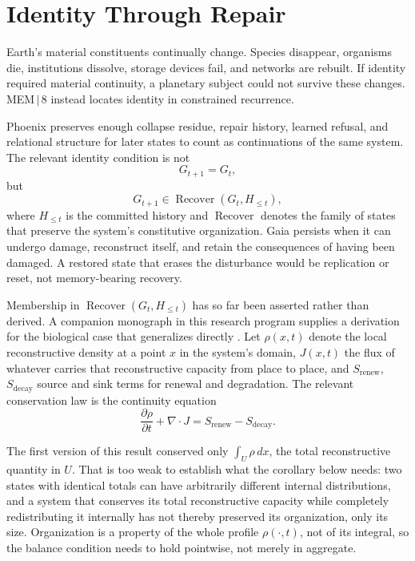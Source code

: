 \documentclass[11pt]{article}
\newcommand{\Recover}{\operatorname{Recover}}
\begin{document}
\section{Identity Through Repair}
\label{sec:identity-repair}

Earth's material constituents continually change. Species disappear, organisms die, institutions dissolve, storage devices fail, and networks are rebuilt. If identity required material continuity, a planetary subject could not survive these changes. MEM\,$|$\,8 instead locates identity in constrained recurrence.

Phoenix preserves enough collapse residue, repair history, learned refusal, and relational structure for later states to count as continuations of the same system. The relevant identity condition is not
\[
G_{t+1} = G_t,
\]
but
\[
G_{t+1} \in \Recover(G_t, H_{\leq t}),
\]
where $H_{\leq t}$ is the committed history and $\Recover$ denotes the family of states that preserve the system's constitutive organization. Gaia persists when it can undergo damage, reconstruct itself, and retain the consequences of having been damaged. A restored state that erases the disturbance would be replication or reset, not memory-bearing recovery.

Membership in $\Recover(G_t,H_{\leq t})$ has so far been asserted rather than derived. A companion monograph in this research program supplies a derivation for the biological case that generalizes directly \cite{flyxionMem8Monograph}. Let $\rho(x,t)$ denote the local reconstructive density at a point $x$ in the system's domain, $J(x,t)$ the flux of whatever carries that reconstructive capacity from place to place, and $S_{\mathrm{renew}}$, $S_{\mathrm{decay}}$ source and sink terms for renewal and degradation. The relevant conservation law is the continuity equation
\[
\frac{\partial \rho}{\partial t} + \nabla\cdot J = S_{\mathrm{renew}} - S_{\mathrm{decay}}.
\]

The first version of this result conserved only $\int_U\rho\,dx$, the total reconstructive quantity in $U$. That is too weak to establish what the corollary below needs: two states with identical totals can have arbitrarily different internal distributions, and a system that conserves its total reconstructive capacity while completely redistributing it internally has not thereby preserved its organization, only its size. Organization is a property of the whole profile $\rho(\cdot,t)$, not of its integral, so the balance condition needs to hold pointwise, not merely in aggregate.
\end{document}
